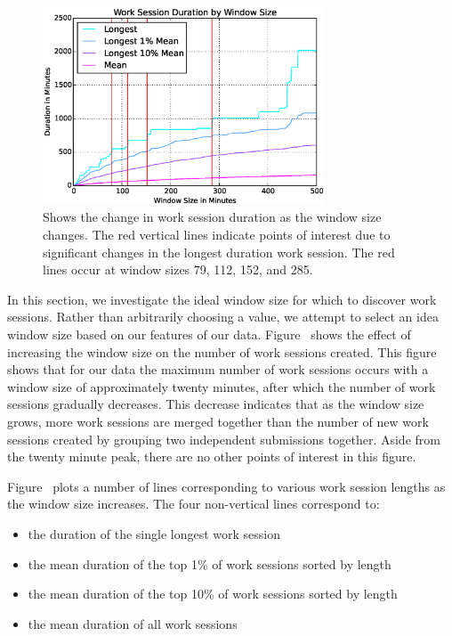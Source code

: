 \begin{figure}[!t]
\centering \includegraphics[width=3.3in]{graphs/Work_Session_Duration_by_Window_Size.eps}
\caption{Shows the change in work session duration as the window size
  changes. The red vertical lines indicate points of interest due to
  significant changes in the longest duration work session. The red lines occur
  at window sizes 79, 112, 152, and 285.}
\end{figure}

In this section, we investigate the ideal window size for which to discover
work sessions. Rather than arbitrarily choosing a value, we attempt to select
an idea window size based on our features of our
data. Figure~ shows the effect of increasing the
window size on the number of work sessions created. This figure shows that for
our data the maximum number of work sessions occurs with a window size of
approximately twenty minutes, after which the number of work sessions gradually
decreases. This decrease indicates that as the window size grows, more work
sessions are merged together than the number of new work sessions created by
grouping two independent submissions together. Aside from the twenty minute
peak, there are no other points of interest in this figure.

Figure~ plots a number of lines corresponding to
various work session lengths as the window size increases. The four
non-vertical lines correspond to:

\begin{itemize}
\item the duration of the single longest work session
\item the mean duration of the top 1\% of work sessions sorted by length
\item the mean duration of the top 10\% of work sessions sorted by length
\item the mean duration of all work sessions
\end{itemize}

